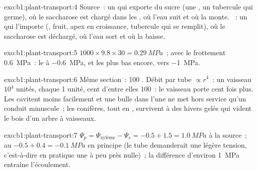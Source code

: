 \begin{solution}{exo:b1:plant-transport:4}
Source~: un  qui exporte du sucre (une , un tubercule qui
germe), où le saccharose est chargé dans les , où l'eau
suit et où la  monte. ~: un  qui l'importe
(, fruit, apex en croissance, tubercule qui se remplit), où le
saccharose est déchargé, où l'eau sort et où la  baisse.
\end{solution}

\begin{solution}{exo:b1:plant-transport:5}
$1000\times 9.8\times 30 = \qty{0.29}{MPa}$~; avec le frottement
\qty{0.6}{MPa}~: le  à \qty{-0.6}{MPa}, et les  plus bas
encore, vers \qty{-1}{MPa}.
\end{solution}

\begin{solution}{exo:b1:plant-transport:6}
Même section~: 100 . Débit par tube $\propto r^4$~: un
vaisseau $10^4$ unités, chaque  1 unité, cent d'entre elles
100~: le vaisseau porte cent fois plus. Les  cavitent moins
facilement et une bulle dans l'une ne met hors service qu'un conduit
minuscule~; les conifères, tout en , survivent à des hivers
gelés qui vident le bois d'un arbre à vaisseaux.
\end{solution}

\begin{solution}{exo:b1:plant-transport:7}
$\Psi_p = \Psi_{\text{xylème}} - \Psi_s = -0.5 + 1.5 = \qty{1.0}{MPa}$
à la source~; au  $-0.5 + 0.4 = \qty{-0.1}{MPa}$ en principe (le
tube demanderait une légère tension, c'est-à-dire en pratique une
 à peu près nulle)~; la différence d'environ \qty{1}{MPa}
entraîne l'écoulement.
\end{solution}

